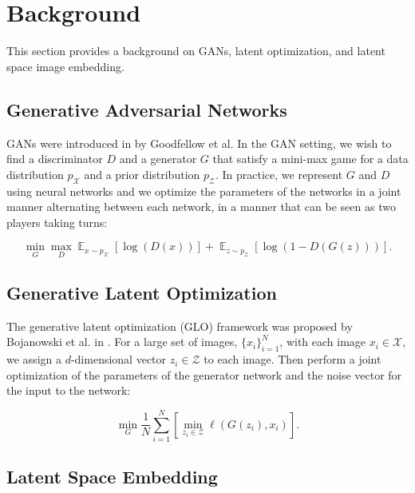 \documentclass[10pt,twocolumn,letterpaper]{article}
\DeclareMathOperator*{\E}{\mathbb{E}}
\begin{document}
\section{Background}

This section provides a background on GANs, latent optimization, and latent space image embedding.

\subsection{Generative Adversarial Networks}

GANs were introduced in \cite{goodfellow2014generative} by Goodfellow et al. In the GAN setting, we wish to find a discriminator $D$ and a generator $G$ that satisfy a mini-max game for a data distribution $p_{\mathcal{X}}$ and a prior distribution $p_{\mathcal{Z}}$. In practice, we represent $G$ and $D$ using neural networks and we optimize the parameters of the networks in a joint manner alternating between each network, in a manner that can be seen as two players taking turns:

\begin{equation}
    \min_{G}\max_{D} \E_{x \sim p_{\mathcal{X}}}\left[\log(D(x))\right] + \E_{z \sim p_{\mathcal{Z}}}\left[\log(1 - D(G(z)))\right].
    \label{eq:gan_opt}
\end{equation}

\subsection{Generative Latent Optimization}

The generative latent optimization (GLO) framework was proposed by Bojanowski et al. in \cite{bojanowski2017optimizing}. For a large set of images, $\{x_i\}_{i=1}^N$, with each image $x_i \in \mathcal{X}$, we assign a $d$-dimensional vector $z_i \in \mathcal{Z}$ to each image. Then perform a joint optimization of the parameters of the generator network and the noise vector for the input to the network:

\begin{equation}
    \min_{G} \frac{1}{N}\sum_{i=1}^{N}\left[\min_{z_i\in\mathcal{Z}} \ell(G(z_i), x_i) \right].
    \label{glo_opt}
\end{equation}

\subsection{Latent Space Embedding}
\end{document}

